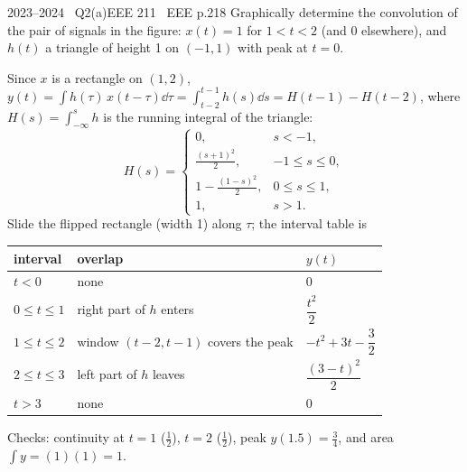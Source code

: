 \begin{qcard}{2023--2024 \textbullet\ Q2(a)}{EEE 211 \textbullet\ EEE p.2}{18}
Graphically determine the convolution of the pair of signals in the figure: $x(t)=1$ for $1<t<2$ (and 0 elsewhere), and $h(t)$ a triangle of height 1 on $(-1,1)$ with peak at $t=0$.
\end{qcard}
\begin{solution}
Since $x$ is a rectangle on $(1,2)$, $y(t)=\int h(\tau)\,x(t-\tau)\dd\tau=\int_{t-2}^{t-1}h(s)\dd s=H(t-1)-H(t-2)$, where $H(s)=\int_{-\infty}^{s}h$ is the running integral of the triangle:
\[H(s)=\begin{cases}0,&s<-1,\\\frac{(s+1)^2}{2},&-1\le s\le0,\\1-\frac{(1-s)^2}{2},&0\le s\le1,\\1,&s>1.\end{cases}\]
Slide the flipped rectangle (width 1) along $\tau$; the interval table is
\begin{center}\small\begin{tabular}{@{}lll@{}}\toprule interval & overlap & $y(t)$\\\midrule
$t<0$ & none & $0$\\
$0\le t\le1$ & right part of $h$ enters & $\dfrac{t^2}{2}$\\
$1\le t\le2$ & window $(t-2,t-1)$ covers the peak & $-t^2+3t-\dfrac32$\\
$2\le t\le3$ & left part of $h$ leaves & $\dfrac{(3-t)^2}{2}$\\
$t>3$ & none & $0$\\\bottomrule\end{tabular}\end{center}
Checks: continuity at $t=1$ ($\frac12$), $t=2$ ($\frac12$), peak $y(1.5)=\frac34$, and area $\int y=(1)(1)=1$.
\begin{center}
\end{center}
\end{solution}

